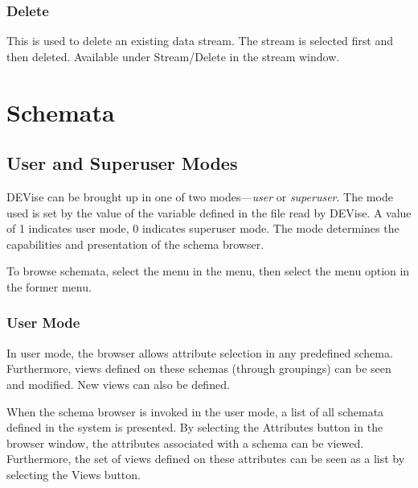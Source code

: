 \subsubsection{Delete}

This is used to delete an existing data stream. The stream is selected first and
then deleted. Available under Stream/Delete in the stream window.


\section{Schemata}


\subsection{User and Superuser Modes}

DEVise can be brought up in one of two modes---{\em user} or {\em superuser}.
The mode used is set by the value of the  variable defined in
the  file read by DEVise. A value of 1 indicates user mode, 0
indicates superuser mode. The mode determines the capabilities and presentation
of the schema browser.

To browse schemata, select the  menu in the  menu, then
select the  menu option in the former menu.

\subsubsection{User Mode}

In user mode, the browser allows attribute selection in any predefined schema.
Furthermore, views defined on these schemas (through groupings) can be seen and
modified. New views can also be defined.

When the schema browser is invoked in the user mode, a list of all schemata
defined in the system is presented. By selecting the Attributes button in the
browser window, the attributes associated with a schema can be viewed.
Furthermore, the set of views defined on these attributes can be seen as a list
by selecting the Views button.

